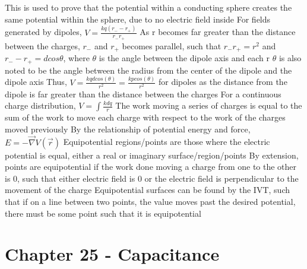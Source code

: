 \documentclass[11 pt, twoside]{article}
\newenvironment{outline*}
{
	\begin{outline}[enumerate]
	}
	{\end{outline}
}
\begin{document}
\begin{outline*}
\3 This is used to prove that the potential within a conducting sphere creates the same potential within the sphere, due to no electric field inside
\2 For fields generated by dipoles, $V = \frac{kq(r_- - r_+)}{r_-r_+}$
\3 As r becomes far greater than the distance between the charges, $r_-$ and $r_+$ becomes parallel, such that $r_-r_+ = r^2$ and $r_- - r_+ = dcos\theta$, where $\theta$ is the angle between the dipole axis and each r
\4 $\theta$ is also noted to be the angle between the radius from the center of the dipole and the dipole axis
\3 Thus, $V = \frac{kqdcos(\theta)}{r^2} = \frac{kpcos(\theta)}{r^2}$ for dipoles as the distance from the dipole is far greater than the distance between the charges
\2 For a continuous charge distribution, $V = \int \frac{kdq}{r}$
\1 The work moving a series of charges is equal to the sum of the work to move each charge with respect to the work of the charges moved previously
\1 By the relationship of potential energy and force, $E = -\vec{\nabla} V(\vec{r})$
\1 Equipotential regions/points are those where the electric potential is equal, either a real or imaginary surface/region/points
\2 By extension, points are equipotential if the work done moving a charge from one to the other is 0, such that either electric field is 0 or the electric field is perpendicular to the movement of the charge
\2 Equipotential surfaces can be found by the IVT, such that if on a line between two points, the value moves past the desired potential, there must be some point such that it is equipotential
\end{outline*}

\section{Chapter 25 - Capacitance}
\end{document}
